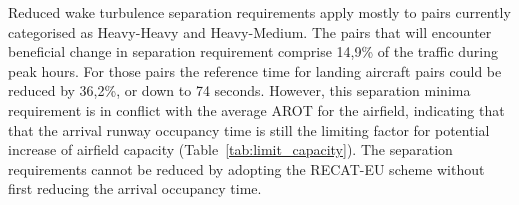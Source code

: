 Reduced wake turbulence separation requirements apply mostly to pairs currently categorised as Heavy-Heavy and Heavy-Medium. 
The pairs that will encounter beneficial change in separation requirement comprise 14,9\% of the traffic during peak hours. For those pairs the reference time for landing aircraft pairs could be reduced by 36,2\%, or down to 74 seconds. However, this separation minima requirement is in conflict with the average AROT for the airfield, indicating that that the arrival runway occupancy time is still the limiting factor for potential increase of airfield capacity (Table~\ref{tab:limit_capacity}). The separation requirements cannot be reduced by adopting the RECAT-EU scheme without first reducing the arrival occupancy time.

\begin{table}[]
\centering
{}
\caption[Limiting capacity factors]{Limiting airfield capacity factor under RECAT-EU for Keflavík Airport during peak hours is repeatedly the arrival occupancy time. Estimate for the AROT and LTI distributions reveal an overlap of the two metrics after re-categorisation. (*) indicates aircraft pairs observing minimum radar separation (MRS) -- a reference value set at 3 NM for BIKF, again due to AROT being a limiting factor.}
\label{tab:limit_capacity}
\end{table}





